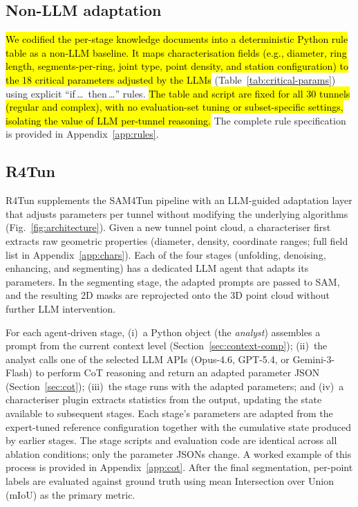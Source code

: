 \documentclass[a4paper,fleqn]{cas-dc}
\begin{document}
{\subsection{Non-LLM adaptation}\label{sec:rule-baseline}

\hl{We codified the per-stage knowledge documents into a deterministic Python rule table as a non-LLM baseline. It maps characterisation fields (e.g., diameter, ring length, segments-per-ring, joint type, point density, and station configuration) to the 18 critical parameters adjusted by the LLMs} (Table~\ref{tab:critical-params}) using explicit ``if\,\ldots\ then\,\ldots'' rules. \hl{The table and script are fixed for all 30 tunnels (regular and complex), with no evaluation-set tuning or subset-specific settings, isolating the value of LLM per-tunnel reasoning.} The complete rule specification is provided in Appendix~\ref{app:rules}.

\subsection{R4Tun}\label{sec:method}

R4Tun supplements the SAM4Tun pipeline with an LLM-guided adaptation layer that adjusts parameters per tunnel without modifying the underlying algorithms (Fig.~\ref{fig:architecture}). Given a new tunnel point cloud, a characteriser first extracts raw geometric properties (diameter, density, coordinate ranges; full field list in Appendix~\ref{app:chars}). Each of the four stages (unfolding, denoising, enhancing, and segmenting) has a dedicated LLM agent that adapts its parameters. In the segmenting stage, the adapted prompts are passed to SAM, and the resulting 2D masks are reprojected onto the 3D point cloud without further LLM intervention.

For each agent-driven stage, (i)~a Python object (the \textit{analyst}) assembles a prompt from the current context level (Section~\ref{sec:context-comp}); (ii)~the analyst calls one of the selected LLM APIs (Opus-4.6, GPT-5.4, or Gemini-3-Flash) to perform CoT reasoning and return an adapted parameter JSON (Section~\ref{sec:cot}); (iii)~the stage runs with the adapted parameters; and (iv)~a characteriser plugin extracts statistics from the output, updating the state available to subsequent stages. Each stage’s parameters are adapted from the expert-tuned reference configuration together with the cumulative state produced by earlier stages. The stage scripts and evaluation code are identical across all ablation conditions; only the parameter JSONs change. A worked example of this process is provided in Appendix~\ref{app:cot}. After the final segmentation, per-point labels are evaluated against ground truth using mean Intersection over Union (mIoU) as the primary metric.

}
\end{document}
